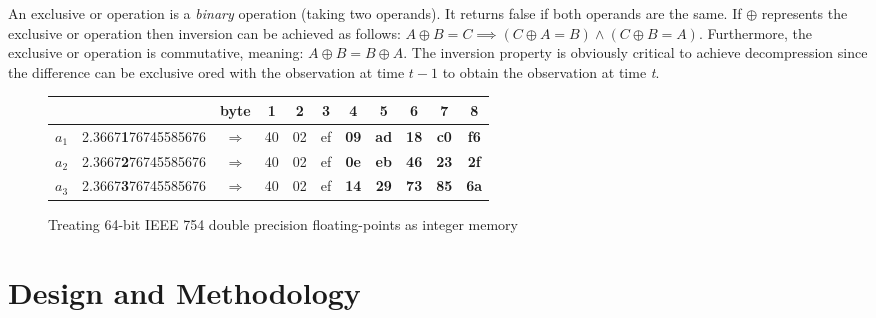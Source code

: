 An exclusive or operation is a \textit{binary} operation (taking two operands). It returns false if both operands are the same. If $\oplus$ represents 
the exclusive or operation then inversion can be achieved as follows: $A\oplus B = C \implies (C\oplus A = B) \wedge (C\oplus B = A)$. Furthermore, the exclusive or operation is commutative, 
meaning: $A\oplus B = B\oplus A$. The inversion property is obviously critical to achieve decompression since the difference can be exclusive ored with the observation at time $t-1$ to obtain 
the observation at time \textit{t}.
\begin{figure}[h!]
\begin{mdframed}
\centering
\begin{tabular}{|c|c|c|c c c c c c c c|}
 \hline
  & & byte & 1 & 2 & 3 & 4 & 5 & 6 & 7 & 8\\
 \hline
 $a_{1}$ & 2.3667\textbf{1}76745585676 & $\Rightarrow$ & 40 & 02 & ef & \textbf{09} & \textbf{ad} & \textbf{18} & \textbf{c0} & \textbf{f6} \\
 \hline
 $a_{2}$ & 2.3667\textbf{2}76745585676 & $\Rightarrow$ & 40 & 02 & ef & \textbf{0e} & \textbf{eb} & \textbf{46} & \textbf{23} & \textbf{2f} \\
 \hline
 $a_{3}$ & 2.3667\textbf{3}76745585676 & $\Rightarrow$ & 40 & 02 & ef & \textbf{14} & \textbf{29} & \textbf{73} & \textbf{85} & \textbf{6a} \\
 \hline
\end{tabular}
\caption{Treating 64-bit IEEE 754 double precision floating-points as integer memory \cite{engelson2000lossless}}
 \label{INT_REP}
\end{mdframed}
\end{figure}
\section{Design and Methodology}
